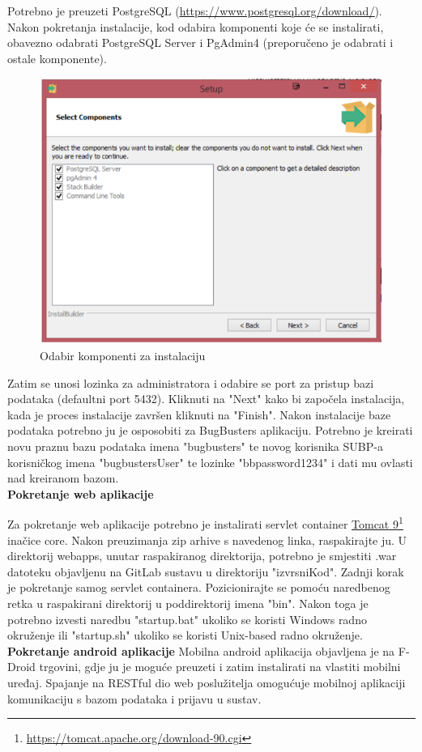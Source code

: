 			Potrebno je preuzeti PostgreSQL (\underline{\url{https://www.postgresql.org/download/}}). Nakon pokretanja instalacije, kod odabira komponenti koje će se instalirati, obavezno odabrati PostgreSQL Server i PgAdmin4 (preporučeno je odabrati i ostale komponente).
			
			\begin{figure}[H]
				\includegraphics[scale=0.65]{Slike/Instalacija.png}
				\centering
				\caption{Odabir komponenti za instalaciju}
				\label{fig:dijagram}
			\end{figure}
			
			Zatim se unosi lozinka za administratora i odabire se port za pristup bazi podataka (defaultni port 5432). Kliknuti na "Next" kako bi započela instalacija, kada je proces instalacije završen kliknuti na "Finish". \newline
			Nakon instalacije baze podataka potrebno ju je osposobiti za BugBusters aplikaciju. Potrebno je kreirati novu praznu bazu podataka imena "bugbusters" te novog korisnika SUBP-a korisničkog imena "bugbustersUser" te lozinke "bbpassword1234" i dati mu ovlasti nad kreiranom bazom.
			\\
			 
	\textbf{Pokretanje web aplikacije}
		
		Za pokretanje web aplikacije potrebno je instalirati servlet container \underline{Tomcat 9}\footnote{\url{https://tomcat.apache.org/download-90.cgi}} inačice core. Nakon preuzimanja zip arhive s navedenog linka, raspakirajte ju. U direktorij webapps, unutar raspakiranog direktorija, potrebno je smjestiti .war datoteku objavljenu na GitLab sustavu u direktoriju "izvrsniKod". Zadnji korak je pokretanje samog servlet containera. Pozicionirajte se pomoću naredbenog retka u raspakirani direktorij u poddirektorij imena "bin". Nakon toga je potrebno izvesti naredbu "startup.bat" ukoliko se koristi Windows radno okruženje ili "startup.sh" ukoliko se koristi Unix-based radno okruženje.
		\\
	
			
		\textbf{Pokretanje android aplikacije}		
		 Mobilna android aplikacija objavljena je na F-Droid trgovini, gdje ju je moguće preuzeti i zatim instalirati na vlastiti mobilni uređaj. Spajanje na RESTful dio web poslužitelja omogućuje mobilnoj aplikaciji komunikaciju s bazom podataka i prijavu u sustav.